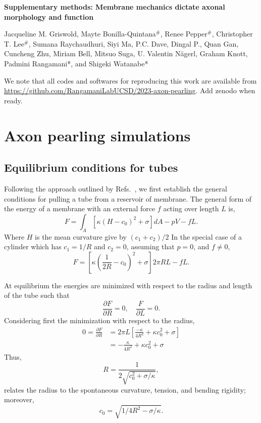 \documentclass[11pt]{article}
\newcommand{\Red}[1]{{\color{red}#1}}
\begin{document}
\begin{centering}
    \textbf{\Large Supplementary methods: Membrane mechanics dictate axonal morphology and function}

    Jacqueline M. Griswold,  Mayte Bonilla\hyphen Quintana\(^{\#}\), Renee Pepper\(^{\#}\), Christopher T. Lee\(^{\#}\), Sumana Raychaudhuri, Siyi Ma, P.C. Dave, Dingal P., Quan Gan, Cuncheng Zhu, Miriam Bell,  Mitsuo Suga, U. Valentin Nägerl, Graham Knott,  Padmini Rangamani*, and Shigeki Watanabe*\\[1cm]
\end{centering}


\noindent We note that all codes and softwares for reproducing this work are available from \url{https://github.com/RangamaniLabUCSD/2023-axon-pearling}.
\Red{Add zenodo when ready}.

\section{Axon pearling simulations}
\subsection{Equilibrium conditions for tubes}
Following the approach outlined by Refs.~\cite{DerenyiEtAl2002,ShurerEtAl2019}, we first establish the general conditions for pulling a tube from a reservoir of membrane.
The general form of the energy of a membrane with an external force \(f\) acting over length \(L\) is,
\begin{equation}
    F = \int_A \left[\kappa(H - c_0)^2 + \sigma \right]dA - pV - fL.
\end{equation}
Where \(H\) is the mean curvature give by \((c_1 + c_2)/2\)
In the special case of a cylinder which has \(c_1 = 1/R\) and \(c_2 = 0\), assuming that \(p=0\), and \(f\neq 0\),
\begin{equation}
    F = \left[ \kappa\left(\frac{1}{2R} - c_0\right)^2 + \sigma\right] 2\pi RL - fL.
\end{equation}

At equilibrium the energies are minimized with respect to the radius and length of the tube such that
\begin{equation}
    \frac{\partial F}{\partial R} = 0,\quad \frac{F}{\partial L} =0.
\end{equation}
Considering first the minimization with respect to the radius,
\begin{align*}
    0 = \frac{\partial F}{\partial R} & = 2\pi L\left[\frac{-\kappa}{4R^2} + \kappa c_0^2 + \sigma\right] \\
                                      & = - \frac{\kappa}{4R^2} + \kappa c_0^2 + \sigma
\end{align*}
Thus,
\begin{equation}
    R = \frac{1}{2\sqrt{c_0^2 + \sigma/\kappa}},
\end{equation}
relates the radius to the spontaneous curvature, tension, and bending rigidity; moreover,
\begin{equation}
    c_0 = \sqrt{1/4R^2 - \sigma/\kappa}.
    \label{eq:spontaneous_curvature_relation}
\end{equation}
\end{document}
